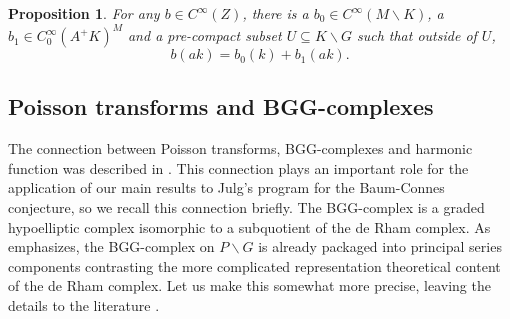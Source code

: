 \documentclass[a4paper,reqno]{amsart}
\numberwithin{equation}{section}
\newtheorem{prop}[thm]{Proposition}
\theoremstyle{definition}
\theoremstyle{remark}
\begin{document}
\begin{prop}
\label{dedcom}
For any $b\in C^\infty(Z)$, there is a $b_0\in C^\infty(M\backslash K)$, a $b_1\in C^\infty_0(A^+K)^M$ and a pre-compact subset $U\subseteq K\backslash G$ such that outside of $U$, 
$$b(ak)=b_0(k)+b_1(ak).$$
\end{prop}


\subsection{Poisson transforms and BGG-complexes} 
\label{subsecpoisson}
The connection between Poisson transforms, BGG-complexes and harmonic function was described in \cite{capjulg}. This connection plays an important role for the application of our main results to Julg's program for the Baum-Connes conjecture, so we recall this connection briefly. The BGG-complex is a graded hypoelliptic complex isomorphic to a subquotient of the de Rham complex. As \cite{capjulg} emphasizes, the BGG-complex on $P\backslash G$ is already packaged into principal series components contrasting the more complicated representation theoretical content of the de Rham complex. Let us make this somewhat more precise, leaving the details to the literature \cite{cap,morecap,Dave_Haller1,goffbgg,julghow}. 
\end{document}
